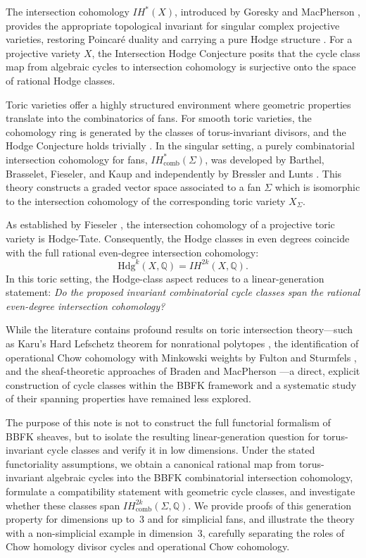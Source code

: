 \documentclass[12pt,reqno]{amsart}
\theoremstyle{plain}
\theoremstyle{definition}
\newcommand{\IQ}{\mathbb{Q}}
\newcommand{\SigmaFan}{\Sigma}
\newcommand{\IHcomb}{IH_{\mathrm{comb}}}
\newcommand{\Hdg}{\mathrm{Hdg}}
\begin{document}
	The intersection cohomology $IH^*(X)$, introduced by Goresky and MacPherson \cite{GM80}, provides the appropriate topological invariant for singular complex projective varieties, restoring Poincar\'e duality and carrying a pure Hodge structure \cite{Saito90}. For a projective variety $X$, the Intersection Hodge Conjecture posits that the cycle class map from algebraic cycles to intersection cohomology is surjective onto the space of rational Hodge classes.
	
	Toric varieties offer a highly structured environment where geometric properties translate into the combinatorics of fans. For smooth toric varieties, the cohomology ring is generated by the classes of torus-invariant divisors, and the Hodge Conjecture holds trivially \cite{Danilov78}. In the singular setting, a purely combinatorial intersection cohomology for fans, $\IHcomb^*(\SigmaFan)$, was developed by Barthel, Brasselet, Fieseler, and Kaup \cite{BBFK} and independently by Bressler and Lunts \cite{BL}. This theory constructs a graded vector space associated to a fan $\SigmaFan$ which is isomorphic to the intersection cohomology of the corresponding toric variety $X_\SigmaFan$.
	
	As established by Fieseler \cite{Fieseler91}, the intersection cohomology of a projective toric variety is Hodge-Tate. Consequently, the Hodge classes in even degrees coincide with the full rational even-degree intersection cohomology:
	\[
	\Hdg^k(X, \IQ) = IH^{2k}(X, \IQ).
	\]
	In this toric setting, the Hodge-class aspect reduces to a linear-generation statement: \emph{Do the proposed invariant combinatorial cycle classes span the rational even-degree intersection cohomology?}
	
	While the literature contains profound results on toric intersection theory---such as Karu's Hard Lefschetz theorem for nonrational polytopes \cite{Karu}, the identification of operational Chow cohomology with Minkowski weights by Fulton and Sturmfels \cite{FS97}, and the sheaf-theoretic approaches of Braden and MacPherson \cite{BM01}---a direct, explicit construction of cycle classes within the BBFK framework and a systematic study of their spanning properties have remained less explored.
	
	The purpose of this note is not to construct the full functorial formalism of BBFK sheaves, but to isolate the resulting linear-generation question for torus-invariant cycle classes and verify it in low dimensions. Under the stated functoriality assumptions, we obtain a canonical rational map from torus-invariant algebraic cycles into the BBFK combinatorial intersection cohomology, formulate a compatibility statement with geometric cycle classes, and investigate whether these classes span $\IHcomb^{2k}(\SigmaFan, \IQ)$. We provide proofs of this generation property for dimensions up to~$3$ and for simplicial fans, and illustrate the theory with a non-simplicial example in dimension~$3$, carefully separating the roles of Chow homology divisor cycles and operational Chow cohomology.
	
\end{document}
